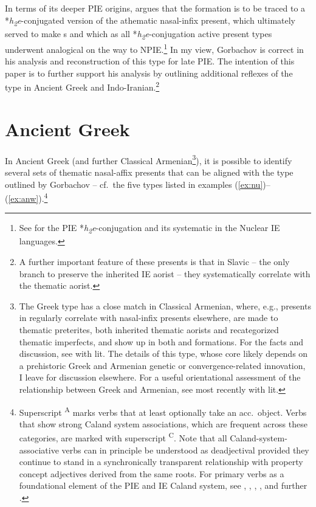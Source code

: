 \documentclass[output=paper,colorlinks,citecolor=brown]{langscibook}
\begin{document}
In terms of its deeper PIE origins, \citet[200--214]{Gorbachov2007} argues that the formation is to be traced to a *\textit{h\textsubscript{2}}\textit{e}-conjugated version of the athematic nasal-infix present, which ultimately served to make s and which as all *\textit{h\textsubscript{2}}\textit{e}-conjugation active present types underwent analogical  on the way to NPIE.\footnote{See \citealt{Jasanoff2003} for the PIE *\textit{h\textsubscript{2}}\textit{e}-conjugation and its systematic  in the Nuclear IE languages.} In my view, Gorbachov is correct in his analysis and reconstruction of this type for late PIE. The intention of this paper is to further support his analysis by outlining additional reflexes of the type in Ancient Greek and Indo-Iranian.\footnote{A further important feature of these presents is that in Slavic -- the only  branch to preserve the inherited IE aorist -- they systematically correlate with the thematic aorist.}

\section{Ancient Greek}

In Ancient Greek (and further Classical Armenian\footnote{\label{fn:ClassArm}The Greek type has a close match in Classical Armenian, where, e.g., presents in  regularly correlate with nasal-infix presents  elsewhere, are made to thematic preterites, both inherited thematic aorists and recategorized thematic imperfects, and show up in both  and  formations. For the facts and discussion, see \citealt[162ff.]{Kocharov2019} with lit. The details of this type, whose core likely depends on a prehistoric Greek and Armenian genetic or convergence-related innovation, I leave for discussion elsewhere. For a useful orientational assessment of the relationship between Greek and Armenian, see most recently \citealt{Kim2018} with lit.}), it is possible to identify several sets of thematic nasal-affix presents  that can be aligned with the  type outlined by Gorbachov -- cf.\ the five types listed in examples (\ref{ex:nu})--(\ref{ex:anw}).\footnote{Superscript \textsuperscript{A} marks verbs that at least optionally take an acc.\ object. Verbs that show strong Caland system  associations, which are frequent across these categories, are marked with superscript \textsuperscript{C}. Note that all Caland-system-associative verbs can in principle be understood as deadjectival  provided they continue to stand in a synchronically transparent relationship with property concept adjectives derived from the same roots. For primary verbs as a foundational element of the PIE and IE Caland system,  see \citealt{Rau2009}, \citeyear{Rau2013}, \citeyear{Rau2016}, \citeyear{Rau2017}, and further \citealt{Nussbaum2022}.} 
\end{document}
